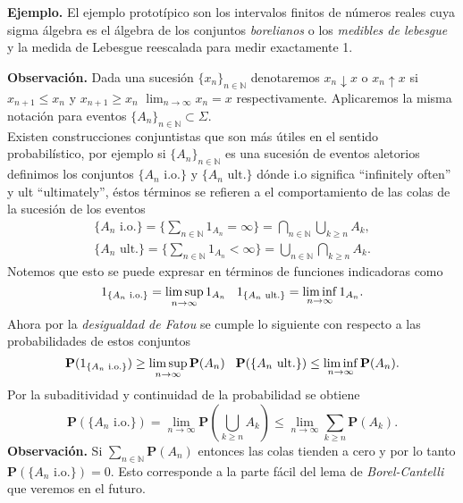 \documentclass[letterpaper]{article}
\newcommand{\nat}{\ensuremath{ \mathbb N }}
\newcommand{\prob}{\textbf{P}}
\newcommand{\eje}{{\newline \noindent \sc \textbf{Ejemplo. }}}
\newcommand{\obs}{{\newline \noindent \sc \textbf{Observación. }}}
\newcommand{\sig}{\ensuremath{\Sigma}}
\begin{document}
\eje El ejemplo prototípico son los intervalos finitos de números reales cuya sigma álgebra es el álgebra de los conjuntos \emph{borelianos} o los \emph{medibles de lebesgue} y la medida de Lebesgue reescalada para medir exactamente 1.

\obs Dada una sucesión \(\{x_n\}_{n\in\nat}\) denotaremos \(x_n\downarrow x\) o \(x_n\uparrow x\) si \(x_{n+1}\leq x_n\) y \(x_{n+1}\geq x_n\) \(\lim_{n\rightarrow\infty}x_n=x\) respectivamente. Aplicaremos la misma notación para eventos \(\{A_n\}_{n\in\nat}\subset\sig\).\\\empty
Existen construcciones conjuntistas que son más útiles en el sentido probabilístico, por ejemplo si \(\{A_n\}_{n\in\nat}\) es una sucesión de eventos aletorios definimos los conjuntos \(\{A_n\text{ i.o.}\}\) y \(\{A_n\text{ ult.}\}\) dónde i.o significa ``infinitely often'' y ult ``ultimately'', éstos términos se refieren a el comportamiento de las colas de la sucesión de los eventos
\begin{align*}
\{A_n\text{ i.o.}\}=\Big\{\sum_{n\in\nat}1_{A_n}=\infty\Big\}=\bigcap_{n\in\nat}\bigcup_{k\geq n}A_k,\\
\{A_n\text{ ult.}\}=\Big\{\sum_{n\in\nat}1_{A_n}<\infty\Big\}=\bigcup_{n\in\nat}\bigcap_{k\geq n}A_k.
\end{align*}
\noindent Notemos que esto se puede expresar en términos de funciones indicadoras como
\[
1_{\{A_n\text{ i.o.}\}}=\limsup_{n\rightarrow\infty}1_{A_n} \hspace{0.3cm} 1_{\{A_n\text{ ult.}\}}=\liminf_{n\rightarrow\infty}1_{A_n}.
\]
\noindent Ahora por la \emph{desigualdad de Fatou} se cumple lo siguiente con respecto a las probabilidades de estos conjuntos
\[
\prob(1_{\{A_n\text{ i.o.}\}})\geq\limsup_{n\rightarrow\infty}\prob(A_n)\hspace{0.3cm} \prob({\{A_n\text{ ult.}\}})\leq\liminf_{n\rightarrow\infty}\prob(A_n).
\]
\noindent Por la subaditividad y continuidad de la probabilidad se obtiene
\[
 \prob(\{A_n\text{ i.o.}\})=\lim_{n\rightarrow\infty}\prob(\bigcup_{k\geq n} A_k)\leq\lim_{n\rightarrow\infty}\sum_{k\geq n}\prob(A_k).
\]
\obs Si \(\sum_{n\in\nat}\prob(A_n)\) entonces las colas tienden a cero y por lo tanto \(\prob(\{A_n\text{ i.o.}\})=0\). Esto corresponde a la parte fácil del lema de \emph{Borel-Cantelli} que veremos en el futuro.
\end{document}
